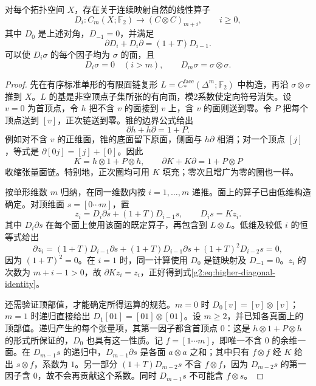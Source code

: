 \begin{lemma}\label{g2:lem:higher-diagonals}
	对每个拓扑空间 \(X\)，存在关于连续映射自然的线性算子
	\[
		D_i:C_m(X;\mathbb F_2)\longrightarrow(C\otimes C)_{m+i},\qquad i\ge0,
	\]
	其中 \(D_0\) 是上述对角，\(D_{-1}=0\)，并满足
	\begin{equation}\label{g2:eq:higher-diagonal-identity}
		\partial D_i+D_i\partial=(1+T)D_{i-1}.
	\end{equation}
	可以使 \(D_i\sigma\) 的每个因子均为 \(\sigma\) 的面，且
	\begin{equation}\label{g2:eq:higher-diagonal-normalization}
		D_i\sigma=0\quad(i>m),\qquad D_m\sigma=\sigma\otimes\sigma.
	\end{equation}
\end{lemma}
\begin{proof}
	先在有序标准单形的有限面链复形 \(L=C_*^{\mathrm{face}}(\Delta^m;\mathbb F_2)\) 中构造，再沿 \(\sigma\otimes\sigma\) 推到 \(X\)。\(L\) 的基是非空顶点子集所张的有向面，模2系数使定向符号消失。设 \(v=0\) 为首顶点，令 \(h\) 把不含 \(v\) 的面接到 \(v\) 上，含 \(v\) 的面则送到零。令 \(P\) 把每个顶点送到 \([v]\)，正次链送到零。锥的边界公式给出
	\[
		\partial h+h\partial=1+P.
	\]
	例如对不含 \(v\) 的正维面，锥的底面留下原面，侧面与 \(h\partial\) 相消；对一个顶点 \([j]\)，等式是 \(\partial[0j]=[j]+[0]\)。因此
	\[
		K=h\otimes1+P\otimes h,\qquad
		\partial K+K\partial=1+P\otimes P
	\]
	收缩张量面链。特别地，正次圈均可用 \(K\) 填充；零次且增广为零的圈也一样。

	按单形维数 \(m\) 归纳，在同一维数内按 \(i=1,\ldots,m\) 递推。面上的算子已由低维构造确定。对顶维面 \(s=[0\cdots m]\)，置
	\begin{equation}\label{g2:eq:higher-diagonal-recursion}
		z_i=D_i\partial s+(1+T)D_{i-1}s,
		\qquad D_is=Kz_i.
	\end{equation}
	其中 \(D_i\partial s\) 在每个面上使用该面的既定算子，再包含到 \(L\otimes L\)。低维及较低 \(i\) 的恒等式给出
	\[
		\partial z_i=(1+T)D_{i-1}\partial s
		+(1+T)D_{i-1}\partial s+(1+T)^2D_{i-2}s=0,
	\]
	因为 \((1+T)^2=0\)。在 \(i=1\) 时，同一计算使用 \(D_0\) 是链映射及 \(D_{-1}=0\)。\(z_i\) 的次数为 \(m+i-1>0\)，故 \(\partial Kz_i=z_i\)，正好得到式\eqref{g2:eq:higher-diagonal-identity}。

	还需验证顶部值，才能确定所得运算的规范。\(m=0\) 时 \(D_0[v]=[v]\otimes[v]\)；\(m=1\) 时递归直接给出 \(D_1[01]=[01]\otimes[01]\)。设 \(m\ge2\)，并已知各真面上的顶部值。递归产生的每个张量项，其第一因子都含首顶点 \(0\)：这是 \(h\otimes1+P\otimes h\) 的形式所保证的，\(D_0\) 也具有这一性质。记 \(f=[1\cdots m]\)，即唯一不含 \(0\) 的余维一面。在 \(D_{m-1}s\) 的递归中，\(D_{m-1}\partial s\) 是各面 \(a\otimes a\) 之和；其中只有 \(f\otimes f\) 经 \(K\) 给出 \(s\otimes f\)，系数为 \(1\)。另一部分 \((1+T)D_{m-2}s\) 不含 \(f\otimes f\)，因为 \(D_{m-2}s\) 的第一因子含 \(0\)，故不会再贡献这个系数。同时 \(D_{m-1}s\) 不可能含 \(f\otimes s\)。


\end{proof}
